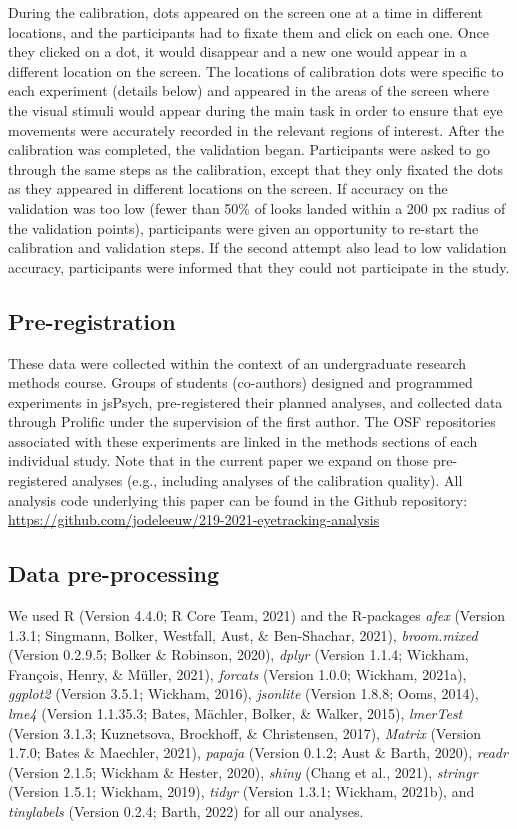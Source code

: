 \documentclass[
  man,floatsintext]{apa6}
\begin{document}
During the calibration, dots appeared on the screen one at a time in
different locations, and the participants had to fixate them and click
on each one. Once they clicked on a dot, it would disappear and a new
one would appear in a different location on the screen. The locations of
calibration dots were specific to each experiment (details below) and
appeared in the areas of the screen where the visual stimuli would
appear during the main task in order to ensure that eye movements were
accurately recorded in the relevant regions of interest. After the
calibration was completed, the validation began. Participants were asked
to go through the same steps as the calibration, except that they only
fixated the dots as they appeared in different locations on the screen.
If accuracy on the validation was too low (fewer than 50\% of looks
landed within a 200 px radius of the validation points),
participants were given an opportunity to re-start the calibration and
validation steps. If the second attempt also lead to low validation
accuracy, participants were informed that they could not participate in
the study.

\subsection{Pre-registration}\label{pre-registration}

These data were collected within the context of an undergraduate research methods course. Groups of students (co-authors) designed and programmed experiments in jsPsych, pre-registered their planned analyses, and collected data through Prolific under the supervision of the first author. The OSF repositories associated with these experiments are linked in the methods sections of each individual study. Note that in the current paper we expand on those pre-registered analyses (e.g., including analyses of the calibration quality). All analysis code underlying this paper can be found in the Github repository: \url{https://github.com/jodeleeuw/219-2021-eyetracking-analysis}

\subsection{Data pre-processing}\label{data-pre-processing}

We used R (Version 4.4.0; R Core Team, 2021) and the R-packages \emph{afex} (Version 1.3.1; Singmann, Bolker, Westfall, Aust, \& Ben-Shachar, 2021), \emph{broom.mixed} (Version 0.2.9.5; Bolker \& Robinson, 2020), \emph{dplyr} (Version 1.1.4; Wickham, François, Henry, \& Müller, 2021), \emph{forcats} (Version 1.0.0; Wickham, 2021a), \emph{ggplot2} (Version 3.5.1; Wickham, 2016), \emph{jsonlite} (Version 1.8.8; Ooms, 2014), \emph{lme4} (Version 1.1.35.3; Bates, Mächler, Bolker, \& Walker, 2015), \emph{lmerTest} (Version 3.1.3; Kuznetsova, Brockhoff, \& Christensen, 2017), \emph{Matrix} (Version 1.7.0; Bates \& Maechler, 2021), \emph{papaja} (Version 0.1.2; Aust \& Barth, 2020), \emph{readr} (Version 2.1.5; Wickham \& Hester, 2020), \emph{shiny} (Chang et al., 2021), \emph{stringr} (Version 1.5.1; Wickham, 2019), \emph{tidyr} (Version 1.3.1; Wickham, 2021b), and \emph{tinylabels} (Version 0.2.4; Barth, 2022) for all our analyses.
\end{document}
